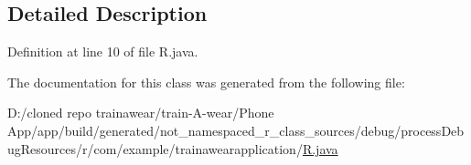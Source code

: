 \subsection{Detailed Description}


Definition at line 10 of file R.\+java.



The documentation for this class was generated from the following file\+:\begin{DoxyCompactItemize}
\item 
D\+:/cloned repo trainawear/train-\/\+A-\/wear/\+Phone App/app/build/generated/not\+\_\+namespaced\+\_\+r\+\_\+class\+\_\+sources/debug/process\+Debug\+Resources/r/com/example/trainawearapplication/\mbox{\hyperlink{process_debug_resources_2r_2com_2example_2trainawearapplication_2_r_8java}{R.\+java}}\end{DoxyCompactItemize}
